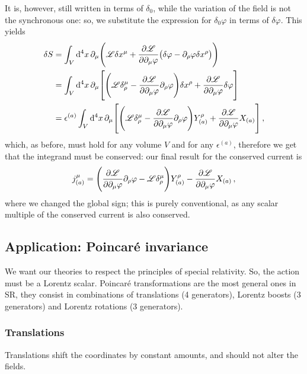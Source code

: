 \documentclass[main.tex]{subfiles}
\begin{document}
It is, however, still written in terms of \(\delta_0 \), while the variation of the field is not the synchronous one: so, we substitute the expression for \(\delta_0 \varphi \) in terms of \(\delta \varphi \). This yields 
%
\begin{align}
\delta S &=
\int_{V} \dd[4]{x} \partial_{\mu } \qty(\mathscr{L} \delta x^{\mu } + \pdv{\mathscr{L}}{\partial_{\mu } \varphi } \qty(\delta \varphi - \partial_{\rho  } \varphi \delta x^{\rho })  )  \\
&= \int_{V} \dd[4]{x} \partial_{\mu } \qty[ \qty(\mathscr{L} \delta^{\mu }_{\rho } - \pdv{\mathscr{L}}{\partial_{\mu } \varphi } \partial_{\rho } \varphi ) \delta x^{\rho }+ \pdv{\mathscr{L}}{\partial_{\mu }\varphi } \delta \varphi ]  \\
&= \epsilon^{(a)}\int_{V} \dd[4]{x} \partial_{\mu } \qty[ \qty(\mathscr{L} \delta^{\mu }_{\rho } - \pdv{\mathscr{L}}{\partial_{\mu } \varphi } \partial_{\rho } \varphi ) Y^{\rho }_{(a)}+ \pdv{\mathscr{L}}{\partial_{\mu }\varphi } X_{(a)} ]
\,,
\end{align}
%
which, as before, must hold for any volume \(V\) and for any \(\epsilon^{(a)}\), therefore we get that the integrand must be conserved: our final result for the conserved current is 
%
\begin{align}
j^{\mu }_{(a)} = \qty(\pdv{\mathscr{L}}{\partial_{\mu } \varphi } \partial_{\rho } \varphi  - \mathscr{L} \delta^{\mu }_{\rho } ) Y^{\rho }_{(a)}-  \pdv{\mathscr{L}}{\partial_{\mu }\varphi } X_{(a)}
\,,
\end{align}
%
where we changed the global sign; this is purely conventional, as any scalar multiple of the conserved current is also conserved.

\subsection{Application: Poincaré invariance}

We want our theories to respect the principles of special relativity. So, the action must be a Lorentz scalar. 
Poincaré transformations are the most general ones in SR, they consist in combinations of translations (4 generators), Lorentz boosts (3 generators) and Lorentz rotations (3 generators).

\subsubsection{Translations}

Translations shift the coordinates by constant amounts, and should not alter the fields. 
\end{document}
